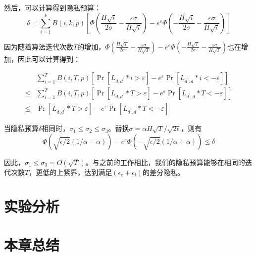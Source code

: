 然后，可以计算得到隐私预算：
\begin{equation}\label{eq:隐私预算计算2}
\delta=\sum_{i=1}^{k} B(i, k, p)\left[\Phi\left(\frac{H \sqrt{i}}{2 \sigma}-\frac{\varepsilon \sigma}{H \sqrt{i}}\right)-e^{\varepsilon} \Phi\left(-\frac{H \sqrt{i}}{2 \sigma}-\frac{\varepsilon \sigma}{H \sqrt{i}}\right)\right]
\end{equation}

因为随着算法迭代次数$T$的增加，$\Phi\left(\frac{H \sqrt{T}}{2 \sigma}-\frac{\varepsilon \sigma}{H \sqrt{T}}\right)-e^{\varepsilon} \Phi\left(-\frac{H \sqrt{T}}{2 \sigma}-\frac{\varepsilon \sigma}{H \sqrt{T}}\right)$也在增加，因此可以计算得到：

\begin{equation}\label{eq:隐私预算计算3}
\begin{aligned}
& \sum_{i=1}^{T} B(i, T, p)\left[\operatorname{Pr}\left[L_{d, d^{\prime}} * i>\varepsilon\right]-e^{\varepsilon} \operatorname{Pr}\left[L_{d^{\prime}, d} * i<-\varepsilon\right]\right] \\
\leq & \sum_{i=1}^{T} B(i, T, p)\left[\operatorname{Pr}\left[L_{d, d^{\prime}} * T>\varepsilon\right]-e^{\varepsilon} \operatorname{Pr}\left[L_{d^{\prime}, d} * T<-\varepsilon\right]\right] \\
\leq & \operatorname{Pr}\left[L_{d, d^{\prime}} * T>\varepsilon\right]-e^{\varepsilon} \operatorname{Pr}\left[L_{d^{\prime}, d} * T<-\varepsilon\right]
\end{aligned}
\end{equation}

当隐私预算$\delta$相同时，$\sigma_{1} \leq \sigma_{2} \leq \sigma_{3}$。替换$\sigma=\alpha H \sqrt{T} / \sqrt{2 \epsilon}$，则有
\begin{equation}\label{eq:隐私预算计算4}
\Phi(\sqrt{\epsilon / 2}(1 / \alpha-\alpha))-e^{\varepsilon} \Phi(-\sqrt{\epsilon / 2}(1 / \alpha+\alpha)) \leq \delta
\end{equation}

因此，$\sigma_{1} \leq \sigma_{3}=O(\sqrt{T})$。与之前的工作相比，我们的隐私预算能够在相同的迭代次数$T$，更低的上紧界，达到满足$\left(\epsilon_{c}+\epsilon_{l}\right)$的差分隐私。

\section{实验分析}

\section{本章总结}


